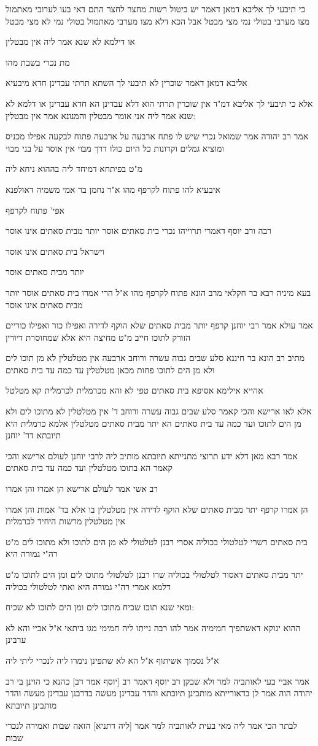 \documentclass[12pt, openany]{book}
\newcommand{\sethebfont}{
\fontsize{10.5pt}{21.0pt} \selectfont
}
\newcommand{\textblock}[1]{
{\sethebfont #1\\}	
}
\begin{document}
\textblock{כי תיבעי לך אליבא דמאן דאמר יש ביטול רשות מחצר לחצר התם דאי בעו לערובי מאתמול מצו מערבי בטולי נמי מצי מבטל אבל הכא דלא מצו מערבי מאתמול בטולי נמי לא מצי מבטל}
\textblock{או דילמא לא שנא אמר ליה אין מבטלין}
\textblock{מת נכרי בשבת מהו}
\textblock{אליבא דמאן דאמר שוכרין לא תיבעי לך השתא תרתי עבדינן חדא מיבעיא}
\textblock{אלא כי תיבעי לך אליבא דמ"ד אין שוכרין תרתי הוא דלא עבדינן הא חדא עבדינן או דלמא לא שנא אמר ליה אני אומר מבטלין והמנונא אמר אין מבטלין:}
\textblock{אמר רב יהודה אמר שמואל נכרי שיש לו פתח ארבעה על ארבעה פתוח לבקעה אפילו מכניס ומוציא גמלים וקרונות כל היום כולו דרך מבוי אין אוסר על בני מבוי}
\textblock{מ"ט בפיתחא דמיחד ליה בההוא ניחא ליה}
\textblock{איבעיא להו פתוח לקרפף מהו א"ר נחמן בר אמי משמיה דאולפנא}
\textblock{אפי' פתוח לקרפף}
\textblock{רבה ורב יוסף דאמרי תרוייהו נכרי בית סאתים אוסר יותר מבית סאתים אינו אוסר}
\textblock{וישראל בית סאתים אינו אוסר}
\textblock{יותר מבית סאתים אוסר}
\textblock{בעא מיניה רבא בר חקלאי מרב הונא פתוח לקרפף מהו א"ל הרי אמרו בית סאתים אוסר יותר מבית סאתים אינו אוסר}
\textblock{אמר עולא אמר רבי יוחנן קרפף יותר מבית סאתים שלא הוקף לדירה ואפילו כור ואפילו כוריים הזורק לתוכו חייב מ"ט מחיצה היא אלא שמחוסרת דיורין}
\textblock{מתיב רב הונא בר חיננא סלע שבים גבוה עשרה ורוחב ארבעה אין מטלטלין לא מן תוכו לים ולא מן הים לתוכו פחות מכאן מטלטלין עד כמה עד בית סאתים}
\textblock{אהייא אילימא אסיפא בית סאתים טפי לא והא מכרמלית לכרמלית קא מטלטל}
\textblock{אלא לאו ארישא והכי קאמר סלע שבים גבוה עשרה ורוחב ד' אין מטלטלין לא מתוכו לים ולא מן הים לתוכו ועד כמה עד בית סאתים הא יתר מבית סאתים מטלטלין אלמא כרמלית היא תיובתא דר' יוחנן}
\textblock{אמר רבא מאן דלא ידע תרוצי מתנייתא תיובתא מותיב ליה לרבי יוחנן לעולם ארישא והכי קאמר הא בתוכו מטלטלין ועד כמה עד בית סאתים}
\textblock{רב אשי אמר לעולם ארישא הן אמרו והן אמרו}
\textblock{הן אמרו קרפף יתר מבית סאתים שלא הוקף לדירה אין מטלטלין בו אלא בד' אמות והן אמרו אין מטלטלין מרשות היחיד לכרמלית}
\textblock{בית סאתים דשרי לטלטולי בכוליה אסרי רבנן לטלטולי לא מן הים לתוכו ולא מתוכו לים מ"ט רה"י גמורה היא}
\textblock{יתר מבית סאתים דאסור לטלטולי בכוליה שרו רבנן לטלטולי מתוכו לים ומן הים לתוכו מ"ט דלמא אמרי רה"י גמורה היא ואתי לטלטולי בכוליה}
\textblock{ומאי שנא תוכו שכיח מתוכו לים ומן הים לתוכו לא שכיח:}
\textblock{ההוא ינוקא דאשתפיך חמימיה אמר להו רבה נייתו ליה חמימי מגו ביתאי א"ל אביי והא לא ערבינן}
\textblock{א"ל נסמוך אשיתוף א"ל הא לא שתפינן נימרו ליה לנכרי ליתי ליה}
\textblock{אמר אביי בעי לאותביה למר ולא שבקן רב יוסף דאמר רב [יוסף אמר רב] כהנא כי הוינן בי רב יהודה הוה אמר לן בדאורייתא מותבינן תיובתא והדר עבדינן מעשה בדרבנן עבדינן מעשה והדר מותבינן תיובתא}
\textblock{לבתר הכי אמר ליה מאי בעית לאותביה למר אמר [ליה דתניא] הזאה שבות ואמירה לנכרי שבות}
\end{document}

